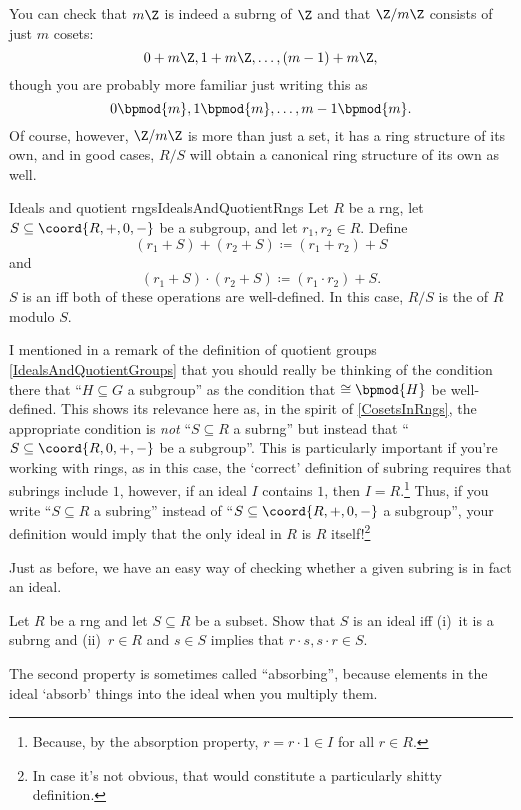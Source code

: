 You can check that $m\Z$ is indeed a subrng of $\Z$ and that $\Z /m\Z$ consists of just $m$ cosets:
\begin{equation}
0+m\Z ,1+m\Z ,\ldots ,(m-1)+m\Z,
\end{equation}
though you are probably more familiar just writing this as
\begin{equation}
0\bpmod{m},1\bpmod{m},\ldots ,m-1\bpmod{m}.
\end{equation}
Of course, however, $\Z /m\Z$ is more than just a set, it has a ring structure of its own, and in good cases, $R/S$ will obtain a canonical ring structure of its own as well.
\begin{dfn}{Ideals and quotient rngs}{IdealsAndQuotientRngs}
Let $R$ be a rng, let $S\subseteq \coord{R,+,0,-}$ be a subgroup, and let $r_1,r_2\in R$.  Define
\begin{equation}
(r_1+S)+(r_2+S)\coloneqq (r_1+r_2)+S
\end{equation}
and
\begin{equation}
(r_1+S)\cdot (r_2+S)\coloneqq (r_1\cdot r_2)+S.
\end{equation}
$S$ is an  iff both of these operations are well-defined.  In this case, $R/S$ is the  of $R$ modulo $S$.
\begin{rmk}
I mentioned in a remark of the definition of quotient groups \cref{IdealsAndQuotientGroups} that you should really be thinking of the condition there that ``$H\subseteq G$ a subgroup'' as the condition that $\cong \bpmod{H}$ be well-defined.  This shows its relevance here as, in the spirit of \cref{CosetsInRngs}, the appropriate condition is \emph{not} ``$S\subseteq R$ a subrng'' but instead that ``$S\subseteq \coord{R,0,+,-}$ be a subgroup''.  This is particularly important if you're working with rings, as in this case, the `correct' definition of subring requires that subrings include $1$, however, if an ideal $I$ contains $1$, then $I=R$.\footnote{Because, by the absorption property, $r=r\cdot 1\in I$ for all $r\in R$.}  Thus, if you write ``$S\subseteq R$ a subring'' instead of ``$S\subseteq \coord{R,+,0,-}$ a subgroup'', your definition would imply that the only ideal in $R$ is $R$ itself!\footnote{In case it's not obvious, that would constitute a particularly shitty definition.}
\end{rmk}
\end{dfn}
Just as before, we have an easy way of checking whether a given subring is in fact an ideal.
\begin{exr}{}{}
Let $R$ be a rng and let $S\subseteq R$ be a subset.  Show that $S$ is an ideal iff (i)~it is a subrng and (ii)~$r\in R$ and $s\in S$ implies that $r\cdot s,s\cdot r\in S$.
\begin{rmk}
The second property is sometimes called ``absorbing'', because elements in the ideal `absorb' things into the ideal when you multiply them.
\end{rmk}
\end{exr}
